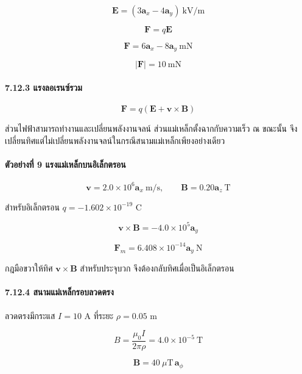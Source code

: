 \[
\mathbf{E}=(3\mathbf{a}_x-4\mathbf{a}_y)\ \text{kV/m}
\]

\[
\mathbf{F}=q\mathbf{E}
\]

\[
\boxed{\mathbf{F}=6\mathbf{a}_x-8\mathbf{a}_y\ \text{mN}}
\]

\[
|\mathbf{F}|=10\ \text{mN}
\]

\paragraph{7.12.3 แรงลอเรนซ์รวม}

\[
\mathbf{F}=q(\mathbf{E}+\mathbf{v}\times\mathbf{B})
\]

ส่วนไฟฟ้าสามารถทำงานและเปลี่ยนพลังงานจลน์ ส่วนแม่เหล็กตั้งฉากกับความเร็ว ณ ขณะนั้น จึงเปลี่ยนทิศแต่ไม่เปลี่ยนพลังงานจลน์ในกรณีสนามแม่เหล็กเพียงอย่างเดียว

\paragraph{ตัวอย่างที่ 9 แรงแม่เหล็กบนอิเล็กตรอน}

\[
\mathbf{v}=2.0\times10^6\mathbf{a}_x\ \text{m/s},\qquad
\mathbf{B}=0.20\mathbf{a}_z\ \text{T}
\]

สำหรับอิเล็กตรอน \(q=-1.602\times10^{-19}\) C

\[
\mathbf{v}\times\mathbf{B}
=-4.0\times10^5\mathbf{a}_y
\]

\[
\boxed{\mathbf{F}_m=6.408\times10^{-14}\mathbf{a}_y\ \text{N}}
\]

กฎมือขวาให้ทิศ \(\mathbf{v}\times\mathbf{B}\) สำหรับประจุบวก จึงต้องกลับทิศเมื่อเป็นอิเล็กตรอน

\paragraph{7.12.4 สนามแม่เหล็กรอบลวดตรง}

ลวดตรงมีกระแส \(I=10\) A ที่ระยะ \(\rho=0.05\) m

\[
B=\frac{\mu_0I}{2\pi\rho}
=4.0\times10^{-5}\ \text{T}
\]

\[
\boxed{\mathbf{B}=40\ \mu\text{T}\,\mathbf{a}_\phi}
\]


